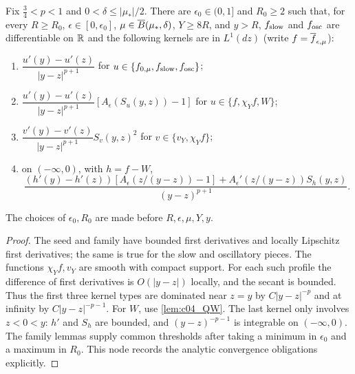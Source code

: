 \begin{lemma}
  \label{lem:c04_residual_integrability}
  Fix $\frac34<p<1$ and $0<\delta\le |\mu_*|/2$. There are
  $\epsilon_0\in(0,1]$ and $R_0\ge2$ such that, for every $R\ge R_0$,
  $\epsilon\in[0,\epsilon_0]$, $\mu\in\overline{B}(\mu_*,\delta)$, $Y\ge8R$, and $y>R$,
  $f_{\textup{slow}}$ and $f_{\textup{osc}}$ are differentiable on $\mathbb{R}$ and the following
  kernels are in $L^1(dz)$ (write $f=\overline{f}_{\epsilon,\mu}$):
  \begin{enumerate}
    \item $\dfrac{u'(y)-u'(z)}{|y-z|^{p+1}}$ for
      $u\in\{f_{0,\mu},f_{\textup{slow}},f_{\textup{osc}}\}$;
    \item $\dfrac{u'(y)-u'(z)}{|y-z|^{p+1}}[A_\epsilon(S_u(y,z))-1]$ for
      $u\in\{f,\chi_Y f,W\}$;
    \item $\dfrac{v'(y)-v'(z)}{|y-z|^{p+1}}S_v(y,z)^2$ for
      $v\in\{v_Y,\chi_Y f\}$;
    \item on $(-\infty,0)$, with $h=f-W$,
      \[
        \frac{(h'(y)-h'(z))[A_\epsilon(z/(y-z))-1]
          +A_\epsilon'(z/(y-z))S_h(y,z)}{(y-z)^{p+1}}.
      \]
  \end{enumerate}
  The choices of $\epsilon_0,R_0$ are made before $R,\epsilon,\mu,Y,y$.
\end{lemma}
\begin{proof}
  The seed and family have bounded first derivatives and locally Lipschitz first derivatives;
  the same is true for the slow and oscillatory pieces. The functions $\chi_Y f,v_Y$ are smooth
  with compact support. For each such profile the difference of first derivatives is
  $O(|y-z|)$ locally, and the secant is bounded. Thus the first three kernel types are
  dominated near $z=y$ by $C|y-z|^{-p}$ and at infinity by $C|y-z|^{-p-1}$.
  For $W$, use \cref{lem:c04_QW}. The last kernel only involves $z<0<y$:
  $h'$ and $S_h$ are bounded, and $(y-z)^{-p-1}$ is integrable on $(-\infty,0)$.
  The family lemmas supply common thresholds after taking a minimum in $\epsilon_0$
  and a maximum in $R_0$. This node records the analytic convergence obligations explicitly.
\end{proof}

